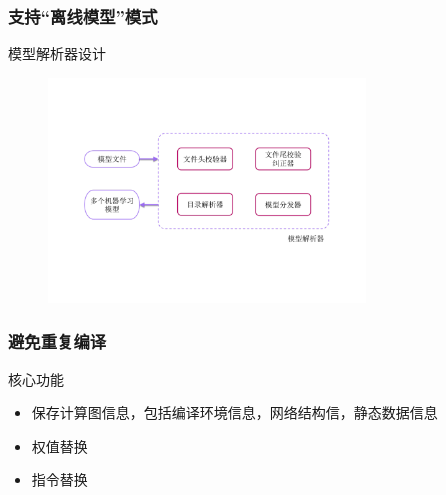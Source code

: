 \documentclass[12pt]{ctexbeamer}
\begin{document}
\begin{frame}
  \frametitle{支持“离线模型”模式}
    \begin{block}{模型解析器设计}
      \begin{figure}
         \includegraphics[width=0.75\textwidth]{figures/model_praser.pdf}
      \end{figure}  
    \end{block}
\end{frame}

\begin{frame}
  \frametitle{避免重复编译}
    \begin{block}{核心功能}
        \begin{itemize}
          \item 保存计算图信息，包括编译环境信息，网络结构信，静态数据信息
          \item 权值替换
          \item 指令替换
        \end{itemize}
    \end{block}
\end{frame}
\end{document}
